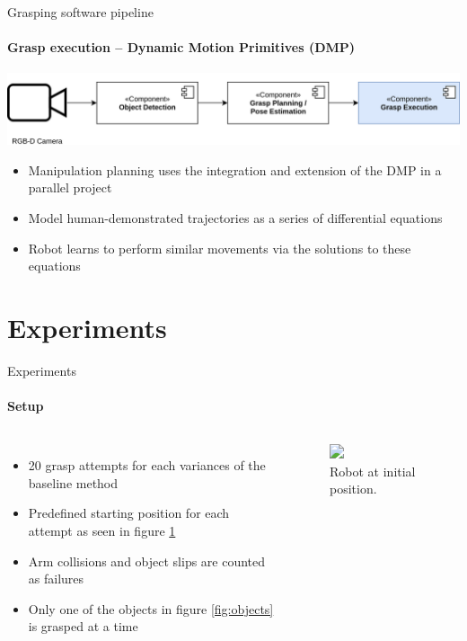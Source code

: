 \documentclass{beamer}
\begin{document}
\begin{frame}{Grasping software pipeline}
    \framesubtitle{Grasp execution -- Dynamic Motion Primitives (DMP)}
    \includegraphics[width=\linewidth]{grasp_pipeline_execution}
    \begin{itemize}
        \item Manipulation planning uses the integration and extension of the DMP in a parallel project
            \cite{Padalkar2018}
        \item Model human-demonstrated trajectories as a series of differential equations
        \item Robot learns to perform similar movements via the solutions to these equations
    \end{itemize}
\end{frame}

\section{Experiments}
\begin{frame}{Experiments}
\framesubtitle{Setup}
    \begin{columns}[onlytextwidth]
        \begin{itemize}
            \footnotesize
            \item 20 grasp attempts for each variances of the baseline method
            \item Predefined starting position for each attempt as seen in figure \ref{fig:exp_setup}
            \item Arm collisions and object slips are counted as failures
            \item Only one of the objects in figure \ref{fig:objects} is grasped at a time
        \end{itemize}
        \begin{figure}[b]
            \includegraphics<1->[width=\textwidth]{experimental_setup}
            \caption{\small Robot at initial position.}
            \label{fig:exp_setup}
        \end{figure}
    \end{columns}
\end{frame}
\end{document}
